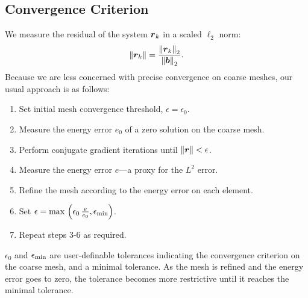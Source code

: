 \documentclass[11pt]{amsart}
\begin{document}
\subsection{Convergence Criterion}
We measure the residual of the system $\boldsymbol{r}_k$ in a scaled $\ell_2$ norm:
\begin{align*}
\left\Vert \boldsymbol{r}_k \right\Vert = \frac{\left\Vert \boldsymbol{r}_k \right\Vert_2}{\left\Vert \boldsymbol{b} \right\Vert_2}.
\end{align*}
Because we are less concerned with precise convergence on coarse meshes, our usual approach is as follows:
\begin{enumerate}
\item Set initial mesh convergence threshold, $\epsilon = \epsilon_0$.
\item Measure the energy error $e_0$ of a zero solution on the coarse mesh.
\item Perform conjugate gradient iterations until $\left\Vert \boldsymbol{r} \right\Vert < \epsilon$.
\item Measure the energy error $e$---a proxy for the $L^2$ error.
\item Refine the mesh according to the energy error on each element.
\item Set $\epsilon = {\rm max} \, \left(\epsilon_0 \, \frac{e}{e_0}, \epsilon_{\rm min}\right)$.
\item Repeat steps 3-6 as required.
\end{enumerate}
$\epsilon_0$ and $\epsilon_{\rm min}$ are user-definable tolerances indicating the convergence criterion on the coarse mesh, and a minimal tolerance.  As the mesh is refined and the energy error goes to zero, the tolerance becomes more restrictive until it reaches the minimal tolerance.
\end{document}
